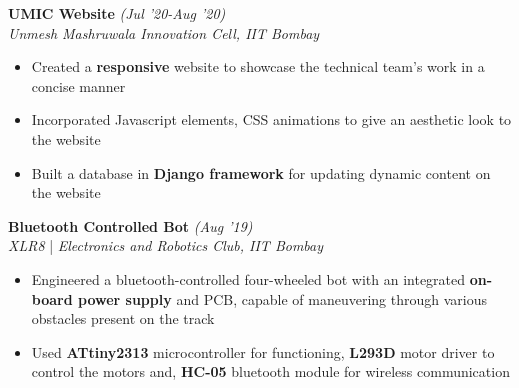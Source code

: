 \documentclass{article}
\begin{document}
\raggedright

\vspace{-5pt}





\large\textbf{UMIC Website} \hfill{ \textit{(Jul '20-Aug '20)}}
\large \\  \textit{Unmesh Mashruwala Innovation Cell, IIT Bombay}

\vspace{-6pt}

\begin{itemize}[itemsep=-1mm, leftmargin=18pt]
	\item Created a \textbf{responsive} website to showcase the technical team's work in a concise manner 
	\item Incorporated Javascript elements, CSS animations to give an aesthetic look to the website
	\item Built a database in \textbf{Django framework} for updating dynamic content on the website
\end{itemize}

\raggedright

\vspace{-5pt}




\large\textbf{Bluetooth Controlled Bot} \hfill{ \textit{(Aug '19)}}
\large \\ \textit{XLR8} | \textit{Electronics and Robotics Club, IIT Bombay}

\vspace{-6pt}

\begin{itemize}[itemsep=-1mm, leftmargin=18pt]
	\item Engineered a bluetooth-controlled four-wheeled bot with an integrated \textbf{on-board power supply} and PCB, capable of maneuvering through various obstacles present on the track
	\item Used \textbf{ATtiny2313} microcontroller for functioning, \textbf{L293D} motor driver to control the motors and, \textbf{HC-05} bluetooth module for wireless communication
\end{itemize}

\vspace{-18pt}

\end{document}
